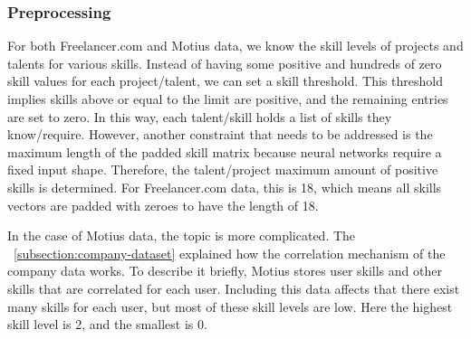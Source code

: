 \subsubsection{Preprocessing}

For both Freelancer.com and Motius data, we know the skill levels of projects and talents for various skills. Instead of having some positive and hundreds of zero skill values for each project/talent, we can set a skill threshold. This threshold implies skills above or equal to the limit are positive, and the remaining entries are set to zero. In this way, each talent/skill holds a list of skills they know/require. However, another constraint that needs to be addressed is the maximum length of the padded skill matrix because neural networks require a fixed input shape. Therefore, the talent/project maximum amount of positive skills is determined. For Freelancer.com data, this is 18, which means all skills vectors are padded with zeroes to have the length of 18. 

In the case of Motius data, the topic is more complicated. The ~\autoref{subsection:company-dataset} explained how the correlation mechanism of the company data works. To describe it briefly, Motius stores user skills and other skills that are correlated for each user. Including this data affects that there exist many skills for each user, but most of these skill levels are low. Here the highest skill level is 2, and the smallest is 0.



